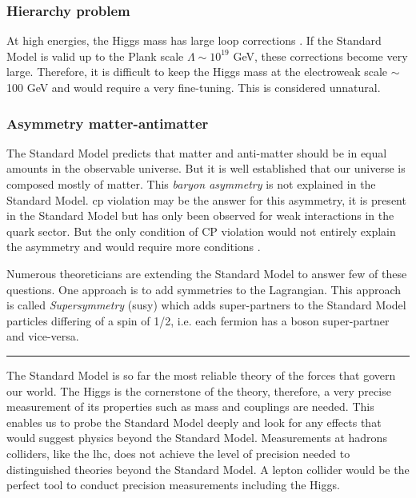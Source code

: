 \subsubsection*{Hierarchy problem}

At high energies, the Higgs mass has large loop corrections \cite{Vieira:2012ex}. If the Standard Model is valid up to the Plank scale $\Lambda \sim 10^19$ GeV, these corrections become very large. Therefore, it is difficult to keep the Higgs mass at the electroweak scale $\sim$100 GeV and would require a very fine-tuning. This is considered unnatural.

\subsubsection*{Asymmetry matter-antimatter}

The Standard Model predicts that matter and anti-matter should be in equal amounts in the observable universe. But it is well established that our universe is composed mostly of matter. This \textit{baryon asymmetry} is not explained in the Standard Model. \acrshort{cp} violation \cite{Ellis:1978hq} may be the answer for this asymmetry, it is present in the Standard Model but has only been observed for weak interactions in the quark sector. But the only condition of CP violation would not entirely explain the asymmetry and would require more conditions \cite{Sakharov:1967dj}.

Numerous theoreticians are extending the Standard Model to answer few of these questions. One approach is to add symmetries to the Lagrangian. This approach is called \textit{Supersymmetry} (\acrshort{susy}) which adds super-partners to the Standard Model particles differing of a spin of 1/2, i.e. each fermion has a boson super-partner and vice-versa.

\begin{center}
\rule{0.5\textwidth}{.4pt}
\end{center}

The Standard Model is so far the most reliable theory of the forces that govern our world. The Higgs is the cornerstone of the theory, therefore, a very precise measurement of its properties such as mass and couplings are needed. This enables us to probe the Standard Model deeply and look for any effects that would suggest physics beyond the Standard Model. Measurements at hadrons colliders, like the \acrlong{lhc}, does not achieve the level of precision needed to distinguished theories beyond the Standard Model. A lepton collider would be the perfect tool to conduct precision measurements including the Higgs.
